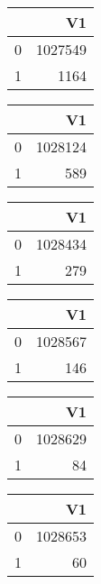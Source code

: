 \bigskip\bigskip
\centering
\begin{tabular}{rr}
  \hline
 & V1 \\ 
  \hline
0 & 1027549 \\ 
  1 & 1164 \\ 
   \hline
\end{tabular}

\bigskip\bigskip
\centering
\begin{tabular}{rr}
  \hline
 & V1 \\ 
  \hline
0 & 1028124 \\ 
  1 & 589 \\ 
   \hline
\end{tabular}

\bigskip\bigskip
\centering
\begin{tabular}{rr}
  \hline
 & V1 \\ 
  \hline
0 & 1028434 \\ 
  1 & 279 \\ 
   \hline
\end{tabular}

\bigskip\bigskip
\centering
\begin{tabular}{rr}
  \hline
 & V1 \\ 
  \hline
0 & 1028567 \\ 
  1 & 146 \\ 
   \hline
\end{tabular}

\bigskip\bigskip
\centering
\begin{tabular}{rr}
  \hline
 & V1 \\ 
  \hline
0 & 1028629 \\ 
  1 &  84 \\ 
   \hline
\end{tabular}

\bigskip\bigskip
\centering
\begin{tabular}{rr}
  \hline
 & V1 \\ 
  \hline
0 & 1028653 \\ 
  1 &  60 \\ 
   \hline
\end{tabular}

